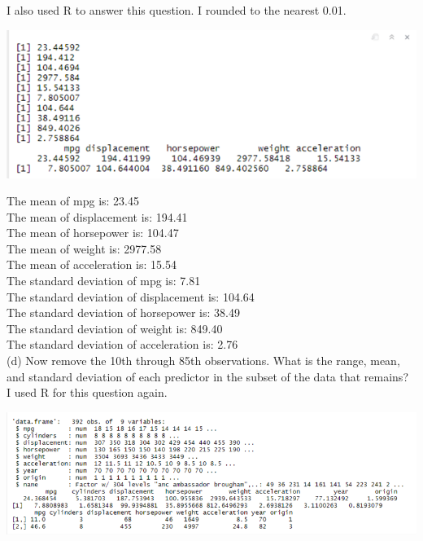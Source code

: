 \documentclass{article}
\begin{document}
\indent\indent I also used R to answer this question. I rounded to the nearest 0.01. \\
\begin{center}
\includegraphics[scale = 0.46]{3.9.c.png} \\
\end{center}
The mean of mpg is: 23.45 \\
The mean of displacement is: 194.41 \\
The mean of horsepower is: 104.47 \\
The mean of weight is: 2977.58 \\
The mean of acceleration is: 15.54 \\
\linebreak The standard deviation of mpg is: 7.81 \\
The standard deviation of displacement is: 104.64 \\
The standard deviation of horsepower is: 38.49 \\
The standard deviation of weight is: 849.40 \\
The standard deviation of acceleration is: 2.76 \\
\linebreak (d) Now remove the 10th through 85th observations. What is the range, mean, and standard deviation of each predictor in the subset of the data that remains? \\
\indent\indent I used R for this question again. \\
\begin{center}
\includegraphics[scale = 0.46]{3.9.d.png} \\
\end{center}
\end{document}
